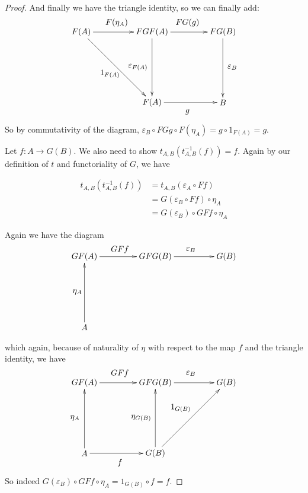 \documentclass[11pt]{article}
\theoremstyle{definition}
\theoremstyle{definition}
\theoremstyle{plain}
\theoremstyle{plain}
\theoremstyle{plain}
\begin{document}
\begin{proof}
And finally we have the triangle identity, so we can finally add:
\begin{equation*}
\begin{xy}
(0,0)*+{F(A)}="1"; (30,0)*+{FGF(A)}="2"; (60,0)*+{FG(B)}="3"; (60,-30)*+{B}="4";
(30,-30)*+{F(A)}="5";
{\ar "1";"2"}?*!/_4mm/{F(\eta_{A})};
{\ar "2";"3"}?*!/_4mm/{FG(g)};
{\ar "3";"4"}?*!/_4mm/{\varepsilon_{B}};
{\ar "2";"5"}?*!/^6mm/{\varepsilon_{F(A)}};
{\ar "5";"4"};?*!/^4mm/{g};
{\ar "1";"5"}?*!/^4mm/{1_{F(A)}};
\end{xy}
\end{equation*}

So by commutativity of the diagram, $\varepsilon_{B} \circ FGg \circ F(\eta_{A}) = g \circ 1_{F(A)} = g$.

Let $f:A \to G(B)$. We also need to show $t_{A,B}(t^{-1}_{A,B}(f)) = f$. Again by our definition of $t$ and functoriality of $G$, we have

\begin{align*}
t_{A,B}(t^{-1}_{A,B}(f))	&= t_{A,B}(\varepsilon_{A} \circ Ff) \\
					&= G(\varepsilon_{B} \circ Ff) \circ \eta_{A} \\
					&= G(\varepsilon_{B}) \circ GFf \circ \eta_{A}
\end{align*}

Again we have the diagram
\begin{equation*}
\begin{xy}
(0,-30)*+{A}="1";(0,0)*+{GF(A)}="2"; (30,0)*+{GFG(B)}="3"; (60,0)*+{G(B)}="4";
{\ar "1";"2"}?*!/_3mm/{\eta_{A}};
{\ar "2";"3"}?*!/_3mm/{GFf};
{\ar "3";"4"}?*!/_3mm/{\varepsilon_{B}};
\end{xy}
\end{equation*}

which again, because of naturality of $\eta$ with respect to the map $f$ and the triangle identity, we have
\begin{equation*}
\begin{xy}
(0,-30)*+{A}="1";(0,0)*+{GF(A)}="2"; (30,0)*+{GFG(B)}="3"; (60,0)*+{G(B)}="4";
(30,-30)*+{G(B)}="5";
{\ar "1";"2"}?*!/_4mm/{\eta_{A}};
{\ar "2";"3"}?*!/_4mm/{GFf};
{\ar "3";"4"}?*!/_4mm/{\varepsilon_{B}};
{\ar "1";"5"}?*!/^4mm/{f};
{\ar "5";"3"}?*!/_6mm/{\eta_{G(B)}};
{\ar "5";"4"}?*!/_6mm/{1_{G(B)}}
\end{xy}
\end{equation*}

So indeed $G(\varepsilon_{B}) \circ GFf \circ \eta_{A} = 1_{G(B)} \circ f = f$.


\end{proof}
\end{document}
